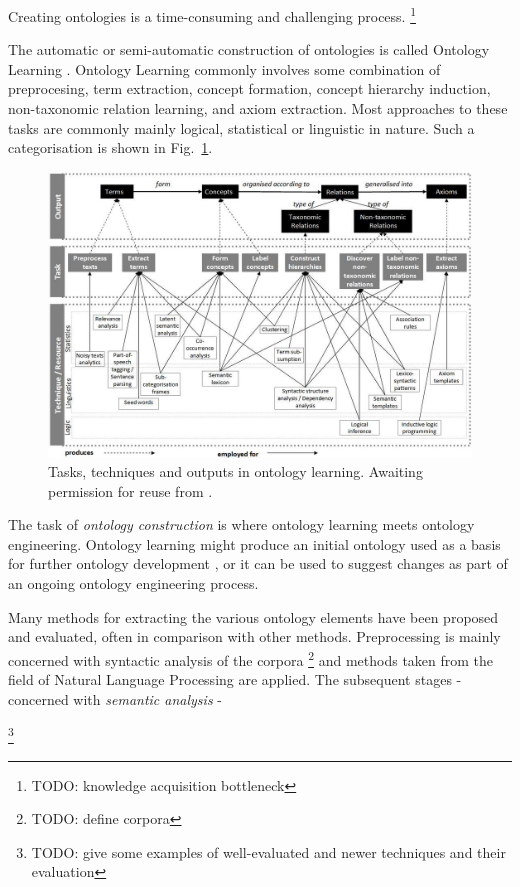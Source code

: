 \documentclass[a4paper]{report}
\newcommand{\todo}[1]{\footnote{{\color{red} TODO: #1}}}
\begin{document}
Creating ontologies is a time-consuming and challenging process.
\todo{knowledge acquisition bottleneck}

The automatic or semi-automatic construction of ontologies is called Ontology Learning \cite{Cimiano06}.
Ontology Learning commonly involves some combination of preprocesing, term extraction, concept formation, concept hierarchy induction, non-taxonomic relation learning, and axiom extraction.
Most approaches to these tasks are commonly mainly logical, statistical or linguistic in nature\cite{Wong11Survey}.
Such a categorisation is shown in Fig.~\ref{fig:tasktechout}.
\begin{figure}
  \includegraphics[width=\textwidth]{graphics/output-task-technique-WongLiuBennamoun.png}
  \caption{Tasks, techniques and outputs in ontology learning. Awaiting permission for reuse from \cite{Wong2009PhD}.}
  \label{fig:tasktechout}
\end{figure}
The task of \emph{ontology construction} is where ontology learning meets ontology engineering.
Ontology learning might produce an initial ontology used as a basis for further ontology development \cite{Voelkner2008Spanish}, or it can be used to suggest changes as part of an ongoing ontology engineering process.

Many methods for extracting the various ontology elements have been proposed and evaluated, often in comparison with other methods.
Preprocessing is mainly concerned with syntactic analysis of the corpora \todo{define corpora} and methods taken from the field of Natural Language Processing are applied.
The subsequent stages - concerned with \emph{semantic analysis} - 

\todo{give some examples of well-evaluated and newer techniques and their evaluation}
\end{document}
